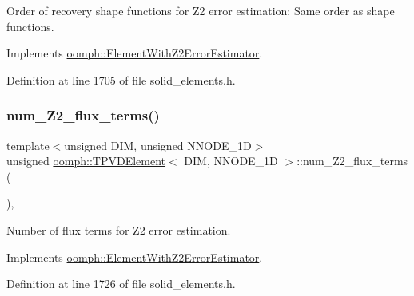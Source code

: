 Order of recovery shape functions for Z2 error estimation\+: Same order as shape functions. 



Implements \hyperlink{classoomph_1_1ElementWithZ2ErrorEstimator_af39480835bd3e0f6b2f4f7a9a4044798}{oomph\+::\+Element\+With\+Z2\+Error\+Estimator}.



Definition at line 1705 of file solid\+\_\+elements.\+h.

\mbox{\label{classoomph_1_1TPVDElement_a2cae6a6faf4fd3f7555f672fad077061}} 
\subsubsection{\texorpdfstring{num\+\_\+\+Z2\+\_\+flux\+\_\+terms()}{num\_Z2\_flux\_terms()}}
{\footnotesize\ttfamily template$<$unsigned D\+IM, unsigned N\+N\+O\+D\+E\+\_\+1D$>$ \\
unsigned \hyperlink{classoomph_1_1TPVDElement}{oomph\+::\+T\+P\+V\+D\+Element}$<$ D\+IM, N\+N\+O\+D\+E\+\_\+1D $>$\+::num\+\_\+\+Z2\+\_\+flux\+\_\+terms (\begin{DoxyParamCaption}{ }\end{DoxyParamCaption})\hspace{0.3cm}{\ttfamily [inline]}, {\ttfamily [virtual]}}



Number of \textquotesingle{}flux\textquotesingle{} terms for Z2 error estimation. 



Implements \hyperlink{classoomph_1_1ElementWithZ2ErrorEstimator_ae82c5728902e13da31be19c390fc28e3}{oomph\+::\+Element\+With\+Z2\+Error\+Estimator}.



Definition at line 1726 of file solid\+\_\+elements.\+h.

\mbox{\label{classoomph_1_1TPVDElement_aa23910847f4faa1d3701756c0f5a1e58}} 
